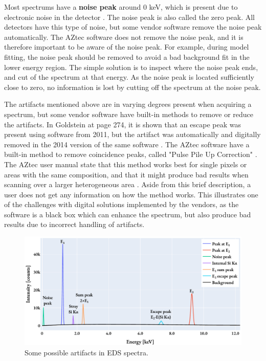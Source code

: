 Most spectrums have a \textbf{noise peak} around $0$ keV, which is present due to electronic noise in the detector \cite{aztec_manual}.
The noise peak is also called the zero peak.
All detectors have this type of noise, but some vendor software remove the noise peak automatically.
The AZtec software does not remove the noise peak, and it is therefore important to be aware of the noise peak.
For example, during model fitting, the noise peak should be removed to avoid a bad background fit in the lower energy region.
The simple solution is to inspect where the noise peak ends, and cut of the spectrum at that energy.
As the noise peak is located sufficiently close to zero, no information is lost by cutting off the spectrum at the noise peak.



The artifacts mentioned above are in varying degrees present when acquiring a spectrum, but some vendor software have built-in methods to remove or reduce the artifacts.
In Goldstein at page 274, it is shown that an escape peak was present using software from 2011, but the artifact was automatically and digitally removed in the 2014 version of the same software \cite[Fig. 18.7]{goldstein_scanning_2018}.
The AZtec software have a built-in method to remove coincidence peaks, called "Pulse Pile Up Correction" \cite{aztec_manual}.
The AZtec user manual state that this method works best for single pixels or areas with the same composition, and that it might produce bad results when scanning over a larger heterogeneous area \cite[p. 99]{aztec_manual}.
Aside from this brief description, a user does not get any information on how the method works.
This illustrates one of the challenges with digital solutions implemented by the vendors, as the software is a black box which can enhance the spectrum, but also produce bad results due to incorrect handling of artifacts. %


\begin{figure}[htbp]
    \centering
    \includegraphics[width=0.95\linewidth]{figures/eds_artifacts.pdf}
    \caption{
        Some possible artifacts in EDS spectra.
    }
    \label{fig:eds_artifacts}
\end{figure}


